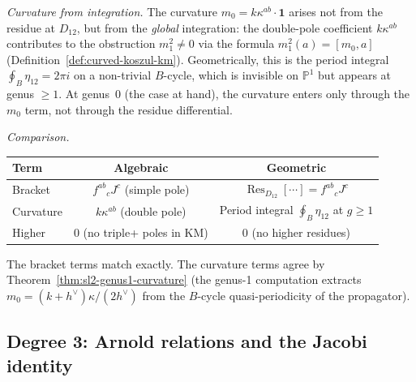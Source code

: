 \begin{computation}
\emph{Curvature from integration.}
The curvature $m_0 = k\kappa^{ab}\cdot\mathbf{1}$ arises not from
the residue at $D_{12}$, but from the \emph{global} integration:
the double-pole coefficient $k\kappa^{ab}$ contributes to the
obstruction $m_1^2 \neq 0$ via the formula
$m_1^2(a) = [m_0, a]$
(Definition~\ref{def:curved-koszul-km}).
Geometrically, this is the period integral
$\oint_{B} \eta_{12} = 2\pi i$ on a non-trivial $B$-cycle,
which is invisible on $\mathbb{P}^1$ but appears at genus $\geq 1$.
At genus~$0$ (the case at hand), the curvature enters only through
the $m_0$ term, not through the residue differential.

\emph{Comparison.}
\begin{center}
\renewcommand{\arraystretch}{1.2}
\begin{tabular}{lcc}
\textbf{Term} & \textbf{Algebraic} & \textbf{Geometric} \\
\hline
Bracket & ${f^{ab}}_c J^c$ (simple pole) &
  $\operatorname{Res}_{D_{12}}[\cdots] = {f^{ab}}_c J^c$ \\
Curvature & $k\kappa^{ab}$ (double pole) &
  Period integral $\oint_B \eta_{12}$ at $g \geq 1$ \\
Higher & $0$ (no triple+ poles in KM) &
  $0$ (no higher residues)
\end{tabular}
\end{center}
The bracket terms match exactly.  The curvature terms agree by
Theorem~\ref{thm:sl2-genus1-curvature} (the genus-1 computation
extracts $m_0 = (k+h^\vee)\kappa/(2h^\vee)$ from the $B$-cycle
quasi-periodicity of the propagator).
\end{computation}

\subsection{Degree 3: Arnold relations and the Jacobi identity}


